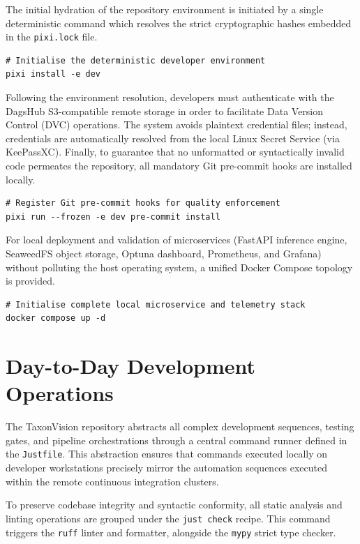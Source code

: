The initial hydration of the repository environment is initiated by a single deterministic command which resolves the strict cryptographic hashes embedded in the \texttt{pixi.lock} file.

\begin{verbatim}
# Initialise the deterministic developer environment
pixi install -e dev
\end{verbatim}

Following the environment resolution, developers must authenticate with the DagsHub S3-compatible remote storage in order to facilitate Data Version Control (DVC) operations. The system avoids plaintext credential files; instead, credentials are automatically resolved from the local Linux Secret Service (via KeePassXC). Finally, to guarantee that no unformatted or syntactically invalid code permeates the repository, all mandatory Git pre-commit hooks are installed locally.

\begin{verbatim}
# Register Git pre-commit hooks for quality enforcement
pixi run --frozen -e dev pre-commit install
\end{verbatim}

For local deployment and validation of microservices (FastAPI inference engine, SeaweedFS object storage, Optuna dashboard, Prometheus, and Grafana) without polluting the host operating system, a unified Docker Compose topology is provided.

\begin{verbatim}
# Initialise complete local microservice and telemetry stack
docker compose up -d
\end{verbatim}


\section{Day-to-Day Development Operations}
\label{sec:day_to_day_operations}

The TaxonVision repository abstracts all complex development sequences, testing gates, and pipeline orchestrations through a central command runner defined in the \texttt{Justfile}. This abstraction ensures that commands executed locally on developer workstations precisely mirror the automation sequences executed within the remote continuous integration clusters.

To preserve codebase integrity and syntactic conformity, all static analysis and linting operations are grouped under the \texttt{just check} recipe. This command triggers the \texttt{ruff} linter and formatter, alongside the \texttt{mypy} strict type checker.

